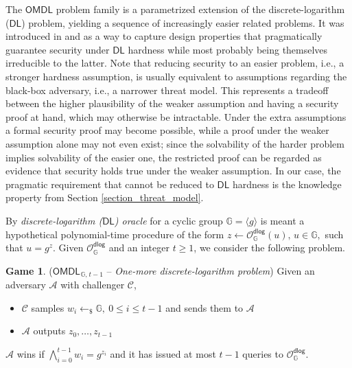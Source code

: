 \documentclass[10pt, psamsfonts, reqno]{amsart}
\theoremstyle{definition}
\newtheorem{attack_game}[thm]{Game}
\theoremstyle{remark}
\numberwithin{equation}{section}
\begin{document}
The $\mathsf{OMDL}$ problem family
is a parametrized extension of
the discrete-logarithm ($\mathsf{DL}$) problem,
yielding a sequence of increasingly easier related problems.
It was introduced in
\cite{paper_bellare_palacio} and
\cite{paper_bellare_omdl}
as a way to capture design properties
that pragmatically guarantee security under
$\mathsf{DL}$ hardness
while most probably being themselves irreducible to the latter.
Note that reducing security to an easier problem,
i.e., a stronger hardness assumption,
is usually equivalent to assumptions
regarding the black-box adversary,
i.e., a narrower threat model.
This represents a tradeoff between the higher plausibility
of the weaker assumption
and having a security proof at hand,
which may otherwise be intractable.
Under the extra assumptions
a formal security proof may become possible,
while a proof under the weaker
assumption alone may not even exist;
since the solvability of the harder problem
implies solvability of the easier one,
the restricted proof can be regarded as
evidence that security holds
true under the weaker assumption.
In our case, the pragmatic requirement
that cannot be reduced to $\mathsf{DL}$ hardness
is the knowledge property
from Section \ref{section_threat_model}.

By \textit{discrete-logarithm \textup{($\mathsf{DL}$)} oracle}
for a cyclic group $\mathbb{G} = \langle g \rangle$
is meant a hypothetical polynomial-time procedure of the form
$z \leftarrow \mathcal{O}_{\mathbb{G}}^{\mathsf{dlog}}(u),
\hspace{2pt} u \in \mathbb{G},$
such that
$u = g ^ z$.
Given $\mathcal{O}_{\mathbb{G}}^{\mathsf{dlog}}$
and an integer $t \ge 1$,
we consider the following problem.

\begin{attack_game}\label{omdl_attack}
\vspace{3pt}
($\mathsf{OMDL}_{\hspace{1pt}\mathbb{G},\hspace{1pt} t-1}$ --
\textit{One-more discrete-logarithm problem})
Given an adversary $\mathcal{A}$ with challenger $\mathcal{C}$,\vspace{2pt}
\begin{itemize}[label=$\circ$,leftmargin=17pt]
	\item
		$\mathcal{C}$ samples $w_i \leftarrow_\$ \mathbb{G},
		\ 0 \le i \le t-1$
		and sends them to $\mathcal{A}$\vspace{5pt}
	\item
		$\mathcal{A}$ outputs $z_0, \dots, z_{t-1}$\vspace{2.5pt}
\end{itemize}
\hspace*{0pt}%
\begin{minipage}{\dimexpr\textwidth-\parindent\relax}%
	\hspace{8pt}$\mathcal{A}$ wins if\hspace{0pt}
	$\bigwedge\limits_{i=0}^{t-1} w_i = g^{z_i}$
	and it has issued at most $t-1$ queries to
	$\mathcal{O}_{\mathbb{G}}^{\mathsf{dlog}}$.
\end{minipage}%
\vspace{3.0pt}
\end{attack_game}
\end{document}
